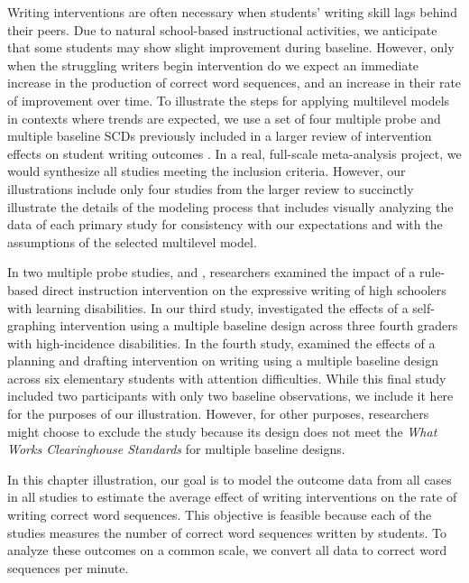 \documentclass[
]{book}
\begin{document}
Writing interventions are often necessary when students' writing skill lags behind their peers. Due to natural school-based instructional activities, we anticipate that some students may show slight improvement during baseline. However, only when the struggling writers begin intervention do we expect an immediate increase in the production of correct word sequences, and an increase in their rate of improvement over time. To illustrate the steps for applying multilevel models in contexts where trends are expected, we use a set of four multiple probe and multiple baseline SCDs previously included in a larger review of intervention effects on student writing outcomes \citep{datchuk2020Level}. In a real, full-scale meta-analysis project, we would synthesize all studies meeting the inclusion criteria. However, our illustrations include only four studies from the larger review to succinctly illustrate the details of the modeling process that includes visually analyzing the data of each primary study for consistency with our expectations and with the assumptions of the selected multilevel model.

In two multiple probe studies, \citet{walker2005using} and \citet{walker2007improving}, researchers examined the impact of a rule-based direct instruction intervention on the expressive writing of high schoolers with learning disabilities. In our third study, \citet{stotz2008Effects} investigated the effects of a self-graphing intervention using a multiple baseline design across three fourth graders with high-incidence disabilities. In the fourth study, \citet{lewandowski2011effects} examined the effects of a planning and drafting intervention on writing using a multiple baseline design across six elementary students with attention difficulties. While this final study included two participants with only two baseline observations, we include it here for the purposes of our illustration. However, for other purposes, researchers might choose to exclude the \citet{lewandowski2011effects} study because its design does not meet the \emph{What Works Clearinghouse Standards} \citeyearpar{WWC2022} for multiple baseline designs.

In this chapter illustration, our goal is to model the outcome data from all cases in all studies to estimate the average effect of writing interventions on the rate of writing correct word sequences. This objective is feasible because each of the studies measures the number of correct word sequences written by students. To analyze these outcomes on a common scale, we convert all data to correct word sequences per minute.
\end{document}
